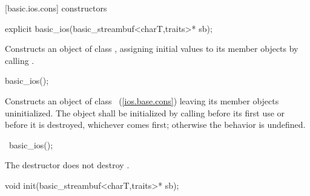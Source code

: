 [basic.ios.cons]{ constructors}

%
\begin{itemdecl}
explicit basic_ios(basic_streambuf<charT,traits>* sb);
\end{itemdecl}

\begin{itemdescr}
\pnum
\effects
Constructs an object of class
,
assigning initial values to its member objects by calling
.
\end{itemdescr}

%
\begin{itemdecl}
basic_ios();
\end{itemdecl}

\begin{itemdescr}
\pnum
\effects
Constructs an object of class
~(\ref{ios.base.cons})
leaving its member objects uninitialized. The object
shall be initialized by calling
before its first use or before it is destroyed, whichever comes first; otherwise the
behavior is undefined.
\end{itemdescr}

%
\begin{itemdecl}
~basic_ios();
\end{itemdecl}

\begin{itemdescr}
\pnum
\notes
The destructor does not destroy
.
\end{itemdescr}

%
%
\begin{itemdecl}
void init(basic_streambuf<charT,traits>* sb);
\end{itemdecl}

